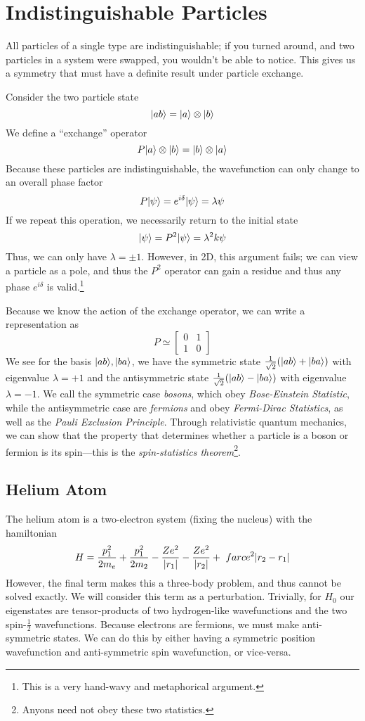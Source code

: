 \chapter{Indistinguishable Particles}
All particles of a single type are indistinguishable; if you turned around, and two particles in a system were swapped, you wouldn't be able to notice. This gives us a symmetry that must have a definite result under particle exchange.

Consider the two particle state
\[\lvert ab\rangle = \lvert a\rangle\otimes\lvert b\rangle\]
We define a ``exchange'' operator
\[P\lvert a\rangle\otimes\lvert b\rangle = \lvert b\rangle\otimes\lvert a\rangle\]
Because these particles are indistinguishable, the wavefunction can only change to an overall phase factor
\[P\lvert\psi\rangle = e^{i\delta}\lvert\psi\rangle = \lambda\psi\]
If we repeat this operation,  we necessarily return to the initial state
\[\lvert\psi\rangle = P^2\lvert\psi\rangle = \lambda^2k\psi\]
Thus, we can only have \(\lambda = \pm 1\). However, in 2D, this argument fails; we can view a particle as a pole, and thus the \(P^2\) operator can gain a residue and thus any phase \(e^{i\delta}\) is valid.\footnote{This is a very hand-wavy and metaphorical argument.}

Because we know the action of the exchange operator, we can write a representation as
\[P \simeq \begin{bmatrix}
	0 & 1 \\ 1 & 0
\end{bmatrix}\]
We see for the basis \(\lvert ab\rangle,\lvert ba\rangle\), we have the symmetric state \(\frac{1}{\sqrt{2}}(\lvert ab\rangle+\lvert ba\rangle)\) with eigenvalue \(\lambda = +1\) and the antisymmetric state \(\frac{1}{\sqrt{2}}(\lvert ab\rangle-\lvert ba\rangle)\) with eigenvalue \(\lambda = -1\). We call the symmetric case \emph{bosons}, which obey \emph{Bose-Einstein Statistic}, while the antisymmetric case are \emph{fermions} and obey \emph{Fermi-Dirac Statistics}, as well as the \emph{Pauli Exclusion Principle}. Through relativistic quantum mechanics, we can show that the property that determines whether a particle is a boson or fermion is its spin---this is the \emph{spin-statistics theorem}\footnote{Anyons need not obey these two statistics. }.

\section{Helium Atom}
The helium atom is a two-electron system (fixing the nucleus) with the hamiltonian
\begin{equation}
	H = \frac{p_1^2}{2m_e}+\frac{p_1^2}{2m_2}-\frac{Ze^2}{\left|r_1\right|} - \frac{Ze^2}{\left|r_2\right|}+\ farc{e^2}{\left|r_2-r_1\right|}
\end{equation}
However, the final term makes this a three-body problem, and thus cannot be solved exactly. We will consider this term as a perturbation. Trivially, for \(H_0\) our eigenstates are tensor-products of two hydrogen-like wavefunctions and the two spin-\(\frac{1}{2}\) wavefunctions. Because electrons are fermions, we must make anti-symmetric states. We can do this by either having a symmetric position wavefunction and anti-symmetric spin wavefunction, or vice-versa. 

